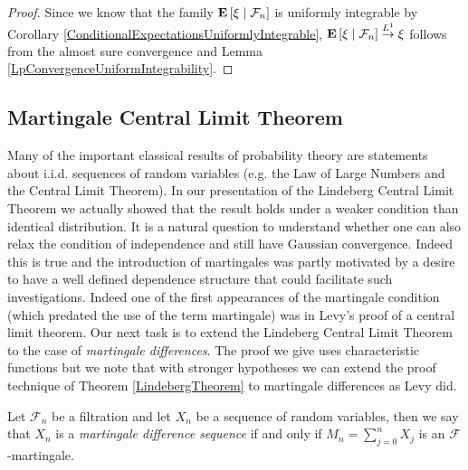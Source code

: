 \begin{proof}
Since we know that the family $\textbf{E}\left[ \xi \mid \mathcal{F}_n \right]$
is uniformly integrable by Corollary
\ref{ConditionalExpectationsUniformlyIntegrable},
$\textbf{E}\left[ \xi \mid \mathcal{F}_n \right] \overset{L^1}\to \xi$ follows from the
almost sure convergence and Lemma \ref{LpConvergenceUniformIntegrability}.
\end{proof}

\subsection{Martingale Central Limit Theorem}

Many of the important classical results of probability theory are
statements about i.i.d. sequences of random variables (e.g. the Law of
Large Numbers and the Central Limit Theorem).  In our presentation of
the Lindeberg Central Limit Theorem we actually showed that the result
holds under a weaker condition than identical distribution.  It is a
natural question to understand whether one can also relax the
condition of independence and still have Gaussian convergence.  Indeed
this is true and the introduction of martingales was partly motivated
by a desire to have a well defined dependence structure that could
facilitate such investigations.  Indeed one of the first appearances
of the martingale condition (which predated the use of the term
martingale) was in Levy's proof of a central limit theorem.  Our next task is to extend the
Lindeberg Central Limit Theorem to the case of \emph{martingale
  differences}.  The proof we give uses characteristic functions but
we note that with stronger hypotheses we can extend the proof
technique of Theorem \ref{LindebergTheorem} to martingale differences
as Levy did.

\begin{defn}Let $\mathcal{F}_n$ be a filtration and let $X_n$ be a
  sequence of random variables, then we say that $X_n$ is a
  \emph{martingale difference sequence} if and only if $M_n =
  \sum_{j=0}^n X_j$ is an $\mathcal{F}$-martingale.
\end{defn}

